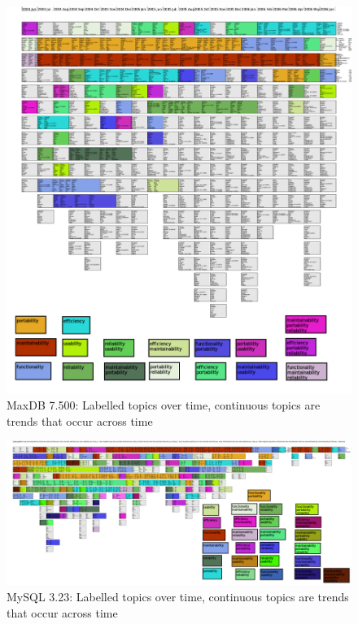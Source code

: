 \documentclass{acm_proc_article-sp}
\begin{document}
\begin{figure}
  \centering
  \includegraphics[height=.9\textheight]{small-maxdb-time-smear-plot-Equal}
  \caption{MaxDB 7.500: Labelled topics over time, continuous topics are trends that occur across time}
  \label{fig:maxdb}
\end{figure}

\begin{figure}[h]
  \centering
  \includegraphics[width=.99\textwidth]{small-mysql-time-smear-plot-Equal}
  \caption{MySQL 3.23: Labelled topics over time, continuous topics are trends that occur across time}
  \label{fig:mysql}
\end{figure}
\end{document}
